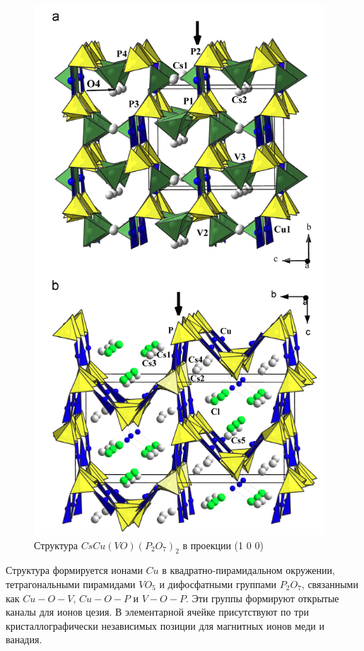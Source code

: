 \documentclass[11pt]{article}
\begin{document}
\begin{figure}[htp]
\centering
\includegraphics[scale=0.7]{CsCuVOP2O72_2}
\caption {Структура $CsCu(VO)(P_2O_7)_2$ в проекции (1 0 0) ~\cite{shvanskaya2015}}
\label{}
\end{figure}

Структура формируется ионами $Cu$ в квадратно-пирамидальном окружении, тетрагональными пирамидами $VO_5$ и дифосфатными группами $P_2O_7$, связанными как $Cu-O-V$, $Cu-O-P$ и $V-O-P$. Эти группы формируют открытые каналы для ионов цезия. В элементарной ячейке присутствуют по три кристаллографически независимых позиции для магнитных ионов меди и ванадия.
\end{document}
